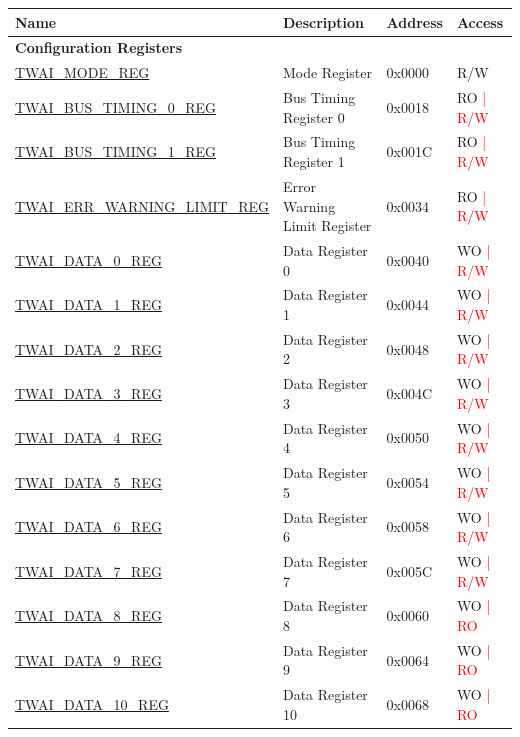\begin{longtable}{ | p{6cm} | p{6cm} | p{1.3cm} | p{2cm} | }
\hline\rowcolor{lightgray}
Name & Description &  Address & Access \\ \hline
\endhead
\multicolumn{4}{|l|}{\textbf{Configuration Registers}} \\ \hline
\hyperref[regdesc:TWAIMODEREG]{TWAI\_MODE\_REG} & Mode Register & 0x0000 & R/W \\ \hline
\hyperref[regdesc:TWAIBUSTIMING0REG]{TWAI\_BUS\_TIMING\_0\_REG} & Bus Timing Register 0 & 0x0018 & RO \textcolor{red}{| R/W} \\ \hline
\hyperref[regdesc:TWAIBUSTIMING1REG]{TWAI\_BUS\_TIMING\_1\_REG} & Bus Timing Register 1 & 0x001C & RO \textcolor{red}{| R/W} \\ \hline
\hyperref[regdesc:TWAIERRWARNINGLIMITREG]{TWAI\_ERR\_WARNING\_LIMIT\_REG} & Error Warning Limit Register & 0x0034 & RO \textcolor{red}{| R/W} \\ \hline
\hyperref[regdesc:TWAIDATA0REG]{TWAI\_DATA\_0\_REG} & Data Register 0 & 0x0040 & WO \textcolor{red}{| R/W} \\ \hline
\hyperref[regdesc:TWAIDATA1REG]{TWAI\_DATA\_1\_REG} & Data Register 1 & 0x0044 & WO \textcolor{red}{| R/W} \\ \hline
\hyperref[regdesc:TWAIDATA2REG]{TWAI\_DATA\_2\_REG} & Data Register 2 & 0x0048 & WO \textcolor{red}{| R/W} \\ \hline
\hyperref[regdesc:TWAIDATA3REG]{TWAI\_DATA\_3\_REG} & Data Register 3 & 0x004C & WO \textcolor{red}{| R/W} \\ \hline
\hyperref[regdesc:TWAIDATA4REG]{TWAI\_DATA\_4\_REG} & Data Register 4 & 0x0050 & WO \textcolor{red}{| R/W} \\ \hline
\hyperref[regdesc:TWAIDATA5REG]{TWAI\_DATA\_5\_REG} & Data Register 5 & 0x0054 & WO \textcolor{red}{| R/W} \\ \hline
\hyperref[regdesc:TWAIDATA6REG]{TWAI\_DATA\_6\_REG} & Data Register 6 & 0x0058 & WO \textcolor{red}{| R/W} \\ \hline
\hyperref[regdesc:TWAIDATA7REG]{TWAI\_DATA\_7\_REG} & Data Register 7 & 0x005C & WO \textcolor{red}{| R/W} \\ \hline
\hyperref[regdesc:TWAIDATA8REG]{TWAI\_DATA\_8\_REG} & Data Register 8 & 0x0060 & WO \textcolor{red}{| RO} \\ \hline
\hyperref[regdesc:TWAIDATA9REG]{TWAI\_DATA\_9\_REG} & Data Register 9 & 0x0064 & WO \textcolor{red}{| RO} \\ \hline
\hyperref[regdesc:TWAIDATA10REG]{TWAI\_DATA\_10\_REG} & Data Register 10 & 0x0068 & WO \textcolor{red}{| RO} \\ \hline

\end{longtable}
